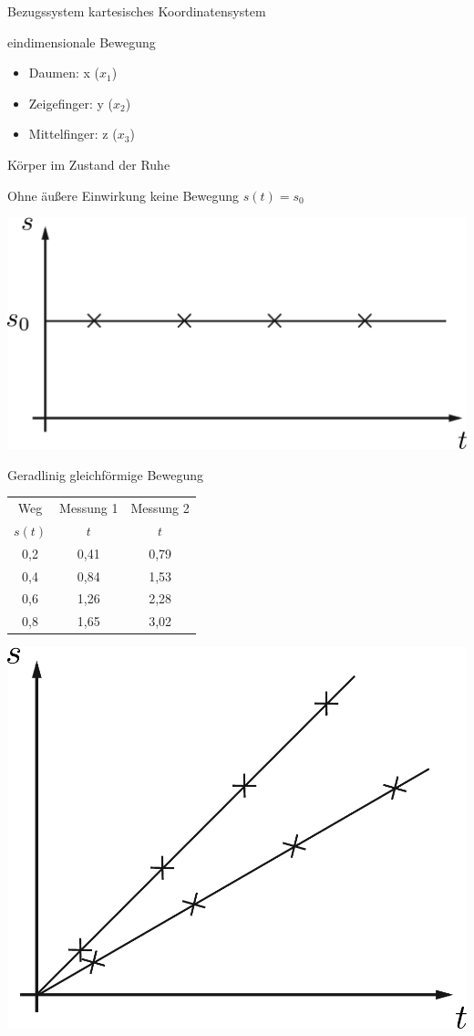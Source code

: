Bezugssystem kartesisches Koordinatensystem

\Ra eindimensionale Bewegung

\begin{itemize}
	\item Daumen: x ($x_1$)
	\item Zeigefinger: y ($x_2$)
	\item Mittelfinger: z ($x_3$)
\end{itemize}

\newpage

 Körper im Zustand der Ruhe

Ohne äußere Einwirkung keine Bewegung $s(t) = s_0$

\begin{center}
	\includegraphics[width=.6\textwidth]{img/1_2}
\end{center}

 Geradlinig gleichförmige Bewegung

\begin{minipage}{.5\textwidth}
	\begin{tabular}{| c | c | c |}
		\hline
		Weg & Messung 1 & Messung 2\\
		$s(t)$ & $t$ & $t$ \\
		\hline
		0,2 & 0,41 & 0,79 \\
		0,4 & 0,84 & 1,53 \\
		0,6 & 1,26 & 2,28 \\
		0,8 & 1,65 & 3,02 \\
		\hline
	\end{tabular}
\end{minipage} \hfill
\begin{minipage}{.5\textwidth}
	\hspace{0.45cm} %
	\includegraphics[width=.7\textwidth]{img/1_3}
\end{minipage}

